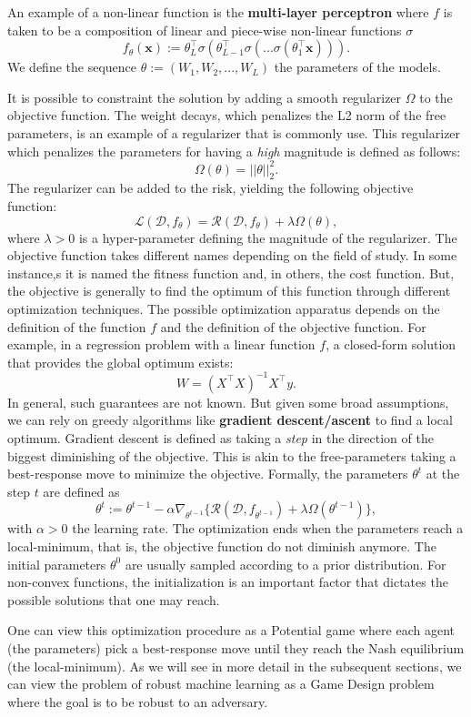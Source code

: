 An example of a non-linear function is the \textbf{multi-layer perceptron} where $f$ is taken to be a composition of linear and piece-wise non-linear functions $\sigma$
\[
f_\theta(\bm x) := \theta_L^\top\sigma(\theta_{L-1}^\top\sigma(...\sigma(\theta_1^\top\bm x))).
\]
We define the sequence $\theta:=(W_1, W_2,..., W_L)$ the parameters of the models.

It is possible to constraint the solution by adding a smooth regularizer $\Omega$ to the objective function. The weight decays, which penalizes the L2 norm of the free parameters, is an example of a regularizer that is commonly use. This regularizer which penalizes the parameters for having a \textit{high} magnitude is defined as follows:
\[
\Omega(\theta) = ||\theta||^2_2.
\]
The regularizer can be added to the risk, yielding the following objective function:
\[
\mathcal{L}(\mathcal{D}, f_\theta) = \mathcal{R}(\mathcal{D}, f_\theta) + \lambda\Omega(\theta),
\]
where $\lambda>0$ is a hyper-parameter defining the magnitude of the regularizer. The objective function takes different names depending on the field of study. In some instance,s it is named the fitness function and, in others, the cost function. But, the objective is generally to find the optimum of this function through different optimization techniques.   
The possible optimization apparatus depends on the definition of the function $f$ and the definition of the objective function. For example, in a regression problem with a linear function $f$, a closed-form solution that provides the global optimum exists:
\[
W = (X^\top X)^{-1}X^\top y.
\]
In general, such guarantees are not known. But given some broad assumptions, we can rely on greedy algorithms like \textbf{gradient descent/ascent} to find a local optimum. Gradient descent is defined as taking a \textit{step} in the direction of the biggest diminishing of the objective. This is akin to the free-parameters taking a best-response move to minimize the objective. Formally, the parameters $\theta^t$ at the step $t$ are defined as
\[
\theta^t := \theta^{t-1} - \alpha\nabla_{\theta^{t-1}}\{\mathcal{R}(\mathcal{D}, f_{\theta^{t-1}}) + \lambda\Omega(\theta^{t-1})\},
\]
with $\alpha>0$ the learning rate. The optimization ends when the parameters reach a local-minimum, that is, the objective function do not diminish anymore. The initial parameters $\theta^0$ are usually sampled according to a prior distribution. For non-convex functions, the initialization is an important factor that dictates the possible solutions that one may reach. 

One can view this optimization procedure as a Potential game where each agent (the parameters) pick a best-response move until they reach the Nash equilibrium (the local-minimum). As we will see in more detail in the subsequent sections, we can view the problem of robust machine learning as a Game Design problem where the goal is to be robust to an adversary.